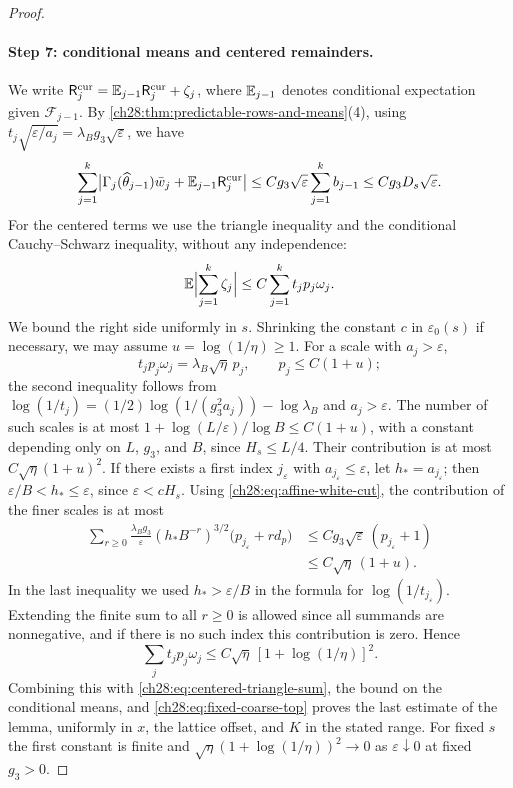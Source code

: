 \begin{proof}
\paragraph{Step 7: conditional means and centered remainders.}
We write $\mathsf R_j^{\rm cur}=\mathbb E_{j-1}\mathsf R_j^{\rm cur}+\zeta_j$, where $\mathbb E_{j-1}$ denotes conditional expectation given $\mathcal F_{j-1}$. By \cref{ch28:thm:predictable-rows-and-means}(4), using $t_j\sqrt{\varepsilon/a_j}=\lambda_Bg_3\sqrt\varepsilon$, we have
\[
 \sum_{j=1}^k\bigl|\Gamma_j(\widehat\theta_{j-1})\bar w_j+\mathbb E_{j-1}\mathsf R_j^{\rm cur}\bigr|\le Cg_3\sqrt\varepsilon\sum_{j=1}^kb_{j-1}\le Cg_3D_s\sqrt\varepsilon.
\]
For the centered terms we use the triangle inequality and the conditional Cauchy--Schwarz inequality, without any independence:
\begin{equation}\label{ch28:eq:centered-triangle-sum}
 \mathbb E\Bigl|\sum_{j=1}^k\zeta_j\Bigr|\le C\sum_{j=1}^kt_jp_j\omega_j.
\end{equation}
We bound the right side uniformly in $s$. Shrinking the constant $c$ in $\varepsilon_0(s)$ if necessary, we may assume $u=\log(1/\eta)\ge1$. For a scale with $a_j>\varepsilon$,
\[
 t_jp_j\omega_j=\lambda_B\sqrt\eta\,p_j,\qquad p_j\le C(1+u);
\]
the second inequality follows from $\log(1/t_j)=(1/2)\log(1/(g_3^2a_j))-\log\lambda_B$ and $a_j>\varepsilon$. The number of such scales is at most $1+\log(L/\varepsilon)/\log B\le C(1+u)$, with a constant depending only on $L$, $g_3$, and $B$, since $H_s\le L/4$. Their contribution is at most $C\sqrt\eta(1+u)^2$. If there exists a first index $j_\varepsilon$ with $a_{j_\varepsilon}\le\varepsilon$, let $h_*=a_{j_\varepsilon}$; then $\varepsilon/B<h_*\le\varepsilon$, since $\varepsilon<cH_s$. Using \eqref{ch28:eq:affine-white-cut}, the contribution of the finer scales is at most
\begin{align*}
 \sum_{r\ge0}\frac{\lambda_Bg_3}{\varepsilon}(h_*B^{-r})^{3/2}\bigl(p_{j_\varepsilon}+rd_p\bigr)&\le Cg_3\sqrt\varepsilon\,(p_{j_\varepsilon}+1)\\
 &\le C\sqrt\eta\,(1+u).
\end{align*}
In the last inequality we used $h_*>\varepsilon/B$ in the formula for $\log(1/t_{j_\varepsilon})$. Extending the finite sum to all $r\ge0$ is allowed since all summands are nonnegative, and if there is no such index this contribution is zero. Hence
\[
 \sum_jt_jp_j\omega_j\le C\sqrt\eta\,[1+\log(1/\eta)]^2.
\]
Combining this with \eqref{ch28:eq:centered-triangle-sum}, the bound on the conditional means, and \eqref{ch28:eq:fixed-coarse-top} proves the last estimate of the lemma, uniformly in $x$, the lattice offset, and $K$ in the stated range. For fixed $s$ the first constant is finite and $\sqrt\eta(1+\log(1/\eta))^2\to0$ as $\varepsilon\downarrow0$ at fixed $g_3>0$.
\end{proof}

